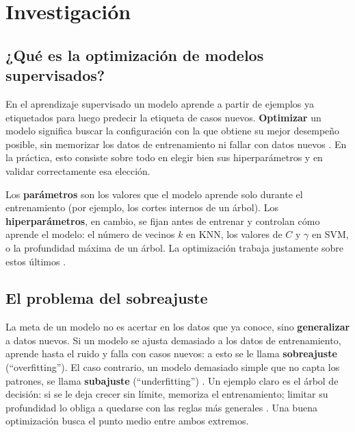 \documentclass[11pt,letterpaper,twoside]{article}
\begin{document}
\section{Investigación}
\label{sec:marco}

\subsection{¿Qué es la optimización de modelos supervisados?}
En el aprendizaje supervisado un modelo aprende a partir de ejemplos ya etiquetados para luego predecir la etiqueta de casos nuevos. \textbf{Optimizar} un modelo significa buscar la configuración con la que obtiene su mejor desempeño posible, sin memorizar los datos de entrenamiento ni fallar con datos nuevos \cite{hastie2009elements,geron2019hands}. En la práctica, esto consiste sobre todo en elegir bien sus hiperparámetros y en validar correctamente esa elección.

\begin{definicion}
Los \textbf{parámetros} son los valores que el modelo aprende solo durante el entrenamiento (por ejemplo, los cortes internos de un árbol). Los \textbf{hiperparámetros}, en cambio, se fijan antes de entrenar y controlan cómo aprende el modelo: el número de vecinos $k$ en KNN, los valores de $C$ y $\gamma$ en SVM, o la profundidad máxima de un árbol. La optimización trabaja justamente sobre estos últimos \cite{probst2019tunability}.
\end{definicion}

\subsection{El problema del sobreajuste}
La meta de un modelo no es acertar en los datos que ya conoce, sino \textbf{generalizar} a datos nuevos. Si un modelo se ajusta demasiado a los datos de entrenamiento, aprende hasta el ruido y falla con casos nuevos: a esto se le llama \textbf{sobreajuste} (``overfitting''). El caso contrario, un modelo demasiado simple que no capta los patrones, se llama \textbf{subajuste} (``underfitting'') \cite{james2013introduction}. Un ejemplo claro es el árbol de decisión: si se le deja crecer sin límite, memoriza el entrenamiento; limitar su profundidad lo obliga a quedarse con las reglas más generales \cite{geron2019hands}. Una buena optimización busca el punto medio entre ambos extremos.
\end{document}
